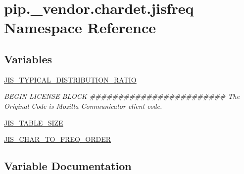 \hypertarget{namespacepip_1_1__vendor_1_1chardet_1_1jisfreq}{}\section{pip.\+\_\+vendor.\+chardet.\+jisfreq Namespace Reference}
\label{namespacepip_1_1__vendor_1_1chardet_1_1jisfreq}
\subsection*{Variables}
\begin{DoxyCompactItemize}
\item 
\hyperlink{namespacepip_1_1__vendor_1_1chardet_1_1jisfreq_a25292688f684c7144a3da33e8a0b2eab}{J\+I\+S\+\_\+\+T\+Y\+P\+I\+C\+A\+L\+\_\+\+D\+I\+S\+T\+R\+I\+B\+U\+T\+I\+O\+N\+\_\+\+R\+A\+T\+IO}
\begin{DoxyCompactList}\small\item\em B\+E\+G\+IN L\+I\+C\+E\+N\+SE B\+L\+O\+CK \#\#\#\#\#\#\#\#\#\#\#\#\#\#\#\#\#\#\#\#\#\#\#\# The Original Code is Mozilla Communicator client code. \end{DoxyCompactList}\item 
\hyperlink{namespacepip_1_1__vendor_1_1chardet_1_1jisfreq_a307b76d70c1291f980a52bd33362465d}{J\+I\+S\+\_\+\+T\+A\+B\+L\+E\+\_\+\+S\+I\+ZE}
\item 
\hyperlink{namespacepip_1_1__vendor_1_1chardet_1_1jisfreq_a8bdcd30fee565fc0af6d740ee88067a2}{J\+I\+S\+\_\+\+C\+H\+A\+R\+\_\+\+T\+O\+\_\+\+F\+R\+E\+Q\+\_\+\+O\+R\+D\+ER}
\end{DoxyCompactItemize}


\subsection{Variable Documentation}
\mbox{\label{namespacepip_1_1__vendor_1_1chardet_1_1jisfreq_a8bdcd30fee565fc0af6d740ee88067a2}} 
